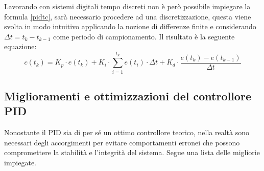 \documentclass[12pt,twoside,openright]{report}
\begin{document}
Lavorando con sistemi digitali tempo discreti non è però possibile impiegare la formula \eqref{pidtc}, sarà necessario procedere ad una discretizzazione, questa viene svolta in modo intuitivo applicando la nozione di differenze finite e considerando $\Delta t = t_k - t_{k-1}$ come periodo di campionamento. Il risultato è la seguente equazione:
\begin{equation}\label{pidtd}
    c(t_k)=K_p \cdot e(t_k) + K_i \cdot \sum_{i=1}^{t_k} e(t_i)\cdot \Delta t + K_d\cdot \frac{e(t_k)-e(t_{k-1})}{\Delta t}
\end{equation}



\subsection{Miglioramenti e ottimizzazioni del controllore PID}\label{betterpid}
Nonostante il PID sia di per sé un ottimo controllore teorico, nella realtà sono necessari degli accorgimenti per evitare comportamenti erronei che possono compromettere la stabilità e l'integrità del sistema. Segue una lista delle migliorie impiegate.
\end{document}
